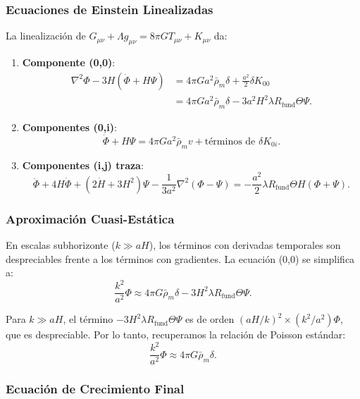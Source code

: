 \documentclass[12pt, a4paper]{article}
\theoremstyle{plain}
\theoremstyle{definition}
\begin{document}
\subsubsection{Ecuaciones de Einstein Linealizadas}

La linealización de $G_{\mu\nu} + \Lambda g_{\mu\nu} = 8\pi G T_{\mu\nu} + K_{\mu\nu}$ da:

\begin{enumerate}
    \item \textbf{Componente (0,0)}:
    \begin{align*}
    \nabla^2 \Phi - 3H(\dot{\Phi} + H\Psi) &= 4\pi G a^2 \bar{\rho}_m \delta + \frac{a^2}{2} \delta K_{00} \\
    &= 4\pi G a^2 \bar{\rho}_m \delta - 3a^2 H^2 \lambda R_{\text{fund}} \Theta \Psi.
    \end{align*}
    
    \item \textbf{Componentes (0,i)}:
    \[
    \dot{\Phi} + H\Psi = 4\pi G a^2 \bar{\rho}_m v + \text{términos de } \delta K_{0i}.
    \]
    
    \item \textbf{Componentes (i,j) traza}:
    \[
    \ddot{\Phi} + 4H\dot{\Phi} + (2\dot{H} + 3H^2)\Psi - \frac{1}{3a^2}\nabla^2(\Phi - \Psi) = -\frac{a^2}{2} \lambda R_{\text{fund}} \Theta H (\Phi + \Psi).
    \]
\end{enumerate}

\subsubsection{Aproximación Cuasi-Estática}

En escalas subhorizonte ($k \gg aH$), los términos con derivadas temporales son despreciables frente a los términos con gradientes. La ecuación (0,0) se simplifica a:
\[
\frac{k^2}{a^2} \Phi \approx 4\pi G \bar{\rho}_m \delta - 3H^2 \lambda R_{\text{fund}} \Theta \Psi.
\]

Para $k \gg aH$, el término $-3H^2 \lambda R_{\text{fund}} \Theta \Psi$ es de orden $(aH/k)^2 \times (k^2/a^2)\Phi$, que es despreciable. Por lo tanto, recuperamos la relación de Poisson estándar:
\[
\frac{k^2}{a^2} \Phi \approx 4\pi G \bar{\rho}_m \delta.
\]

\subsubsection{Ecuación de Crecimiento Final}
\end{document}

